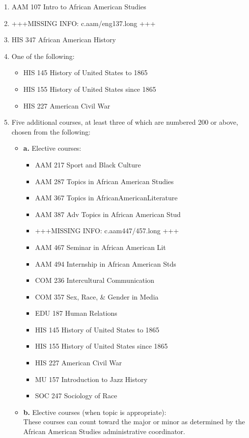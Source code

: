 \documentclass[
  letterpaper,
]{scrbook}
\providecommand{\tightlist}{%
  \setlength{\itemsep}{0pt}\setlength{\parskip}{0pt}}
\begin{document}
\begin{enumerate}
\def\labelenumi{\arabic{enumi}.}
\tightlist
\item
  AAM 107 Intro to African American Studies
\item
  +++MISSING INFO: c.aam/eng137.long +++
\item
  HIS 347 African American History
\item
  One of the following:

  \begin{itemize}
  \tightlist
  \item
    HIS 145 History of United States to 1865
  \item
    HIS 155 History of United States since 1865
  \item
    HIS 227 American Civil War
  \end{itemize}
\item
  Five additional courses, at least three of which are numbered 200 or
  above, chosen from the following:

  \begin{itemize}
  \item
    \textbf{a.} Elective courses:

    \begin{itemize}
    \tightlist
    \item
      AAM 217 Sport and Black Culture
    \item
      AAM 287 Topics in African American Studies
    \item
      AAM 367 Topics in AfricanAmericanLiterature
    \item
      AAM 387 Adv Topics in African American Stud
    \item
      +++MISSING INFO: c.aam447/457.long +++
    \item
      AAM 467 Seminar in African American Lit
    \item
      AAM 494 Internship in African American Stds
    \item
      COM 236 Intercultural Communication
    \item
      COM 357 Sex, Race, \& Gender in Media
    \item
      EDU 187 Human Relations
    \item
      HIS 145 History of United States to 1865
    \item
      HIS 155 History of United States since 1865
    \item
      HIS 227 American Civil War
    \item
      MU 157 Introduction to Jazz History
    \item
      SOC 247 Sociology of Race
    \end{itemize}
  \item
    \textbf{b.} Elective courses (when topic is appropriate): ~\\
    These courses can count toward the major or minor as determined by
    the African American Studies administrative coordinator.


\end{itemize}
\end{enumerate}
\end{document}
